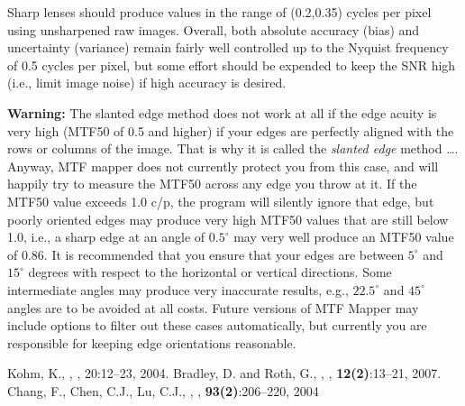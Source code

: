 \documentclass[a4paper]{article}
\begin{document}
Sharp lenses should produce values in the range of (0.2,0.35) cycles per
pixel using unsharpened raw images.  Overall, both absolute accuracy (bias)
and uncertainty (variance) remain fairly well controlled up to the Nyquist
frequency of 0.5 cycles per pixel, but some effort should be expended to
keep the SNR high (i.e., limit image noise) if high accuracy is desired.

\textbf{Warning:} The slanted edge method does not work at all if the edge
acuity is very high (MTF50 of 0.5 and higher) if your edges
are perfectly aligned with the rows or columns of the image. That is why it
is called the \emph{slanted edge} method \ldots. Anyway, MTF mapper does not
currently protect you from this case, and will happily try to measure the
MTF50 across any edge you throw at it. If the MTF50 value exceeds 1.0 c/p,
the program will silently ignore that edge, but poorly oriented edges may
produce very high MTF50 values that are still below 1.0, i.e., a sharp edge at an
angle of $0.5^\circ$ may very well produce an MTF50 value of 0.86. It is
recommended that you ensure that your edges are between $5^\circ$ and
$15^\circ$ degrees with respect to the horizontal or vertical directions.
Some intermediate angles may produce very inaccurate results, e.g.,
$22.5^\circ$ and $45^\circ$ angles are to be avoided at all costs. Future
versions of MTF Mapper may include options to filter out these cases
automatically, but currently you are responsible for keeping edge orientations
reasonable.





\begin{thebibliography}{9}
 Kohm, K., , , 20:12--23, 2004.
 Bradley, D. and Roth, G.,
,
, \textbf{12(2)}:13--21,
2007.
 Chang, F., Chen, C.J., Lu, C.J.,
,
, \textbf{93(2)}:206--220,
2004
\end{thebibliography}
\end{document}
